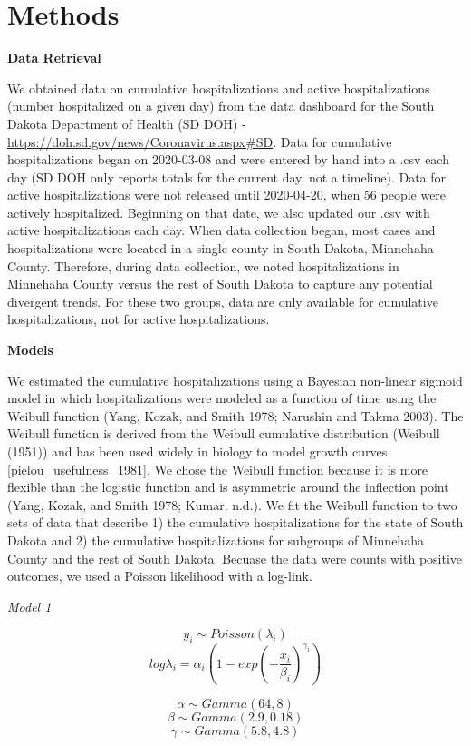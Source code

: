 \documentclass[
]{article}
\begin{document}
\hypertarget{methods}{%
\section{Methods}\label{methods}}

\textbf{Data Retrieval}

We obtained data on cumulative hospitalizations and active hospitalizations (number hospitalized on a given day) from the data dashboard for the South Dakota Department of Health (SD DOH) - \url{https://doh.sd.gov/news/Coronavirus.aspx\#SD}. Data for cumulative hospitalizations began on 2020-03-08 and were entered by hand into a .csv each day (SD DOH only reports totals for the current day, not a timeline). Data for active hospitalizations were not released until 2020-04-20, when 56 people were actively hospitalized. Beginning on that date, we also updated our .csv with active hospitalizations each day.
When data collection began, most cases and hospitalizations were located in a single county in South Dakota, Minnehaha County. Therefore, during data collection, we noted hospitalizations in Minnehaha County versus the rest of South Dakota to capture any potential divergent trends. For these two groups, data are only available for cumulative hospitalizations, not for active hospitalizations.

\textbf{Models}

We estimated the cumulative hospitalizations using a Bayesian non-linear sigmoid model in which hospitalizations were modeled as a function of time using the Weibull function (Yang, Kozak, and Smith 1978; Narushin and Takma 2003). The Weibull function is derived from the Weibull cumulative distribution (Weibull (1951)) and has been used widely in biology to model growth curves {[}pielou\_usefulness\_1981{]}. We chose the Weibull function because it is more flexible than the logistic function and is asymmetric around the inflection point (Yang, Kozak, and Smith 1978; Kumar, n.d.). We fit the Weibull function to two sets of data that describe 1) the cumulative hospitalizations for the state of South Dakota and 2) the cumulative hospitalizations for subgroups of Minnehaha County and the rest of South Dakota. Becuase the data were counts with positive outcomes, we used a Poisson likelihood with a log-link.

\emph{Model 1}

\[y_i \sim Poisson(\lambda_i)\]
\[log\lambda_i = \alpha_i(1 - exp(-\frac{x_i}{\beta_i})^{\gamma_i})\]

\[\alpha \sim Gamma(64,8)\]
\[\beta \sim Gamma(2.9, 0.18)\]
\[\gamma \sim Gamma(5.8,4.8)\]
\end{document}
